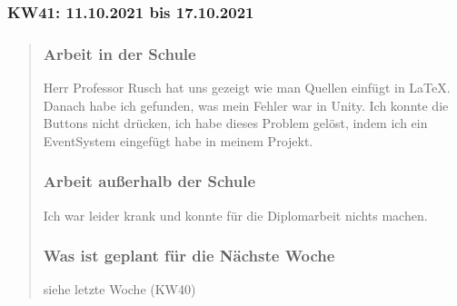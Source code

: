 \subsubsection{KW41: 11.10.2021 bis 17.10.2021}
\begin{quote}
	\subsubsection*{Arbeit in der Schule}
	Herr Professor Rusch hat uns gezeigt wie man Quellen einfügt in LaTeX. Danach habe ich gefunden, was mein Fehler war in Unity. Ich konnte die Buttons nicht drücken, ich habe dieses Problem gelöst, indem ich ein EventSystem eingefügt habe in meinem Projekt.
	
	\subsubsection*{Arbeit außerhalb der Schule}
	Ich war leider krank und konnte für die Diplomarbeit nichts machen.
	
	\subsubsection*{Was ist geplant für die Nächste Woche}
	siehe letzte Woche (KW40)
\end{quote}

